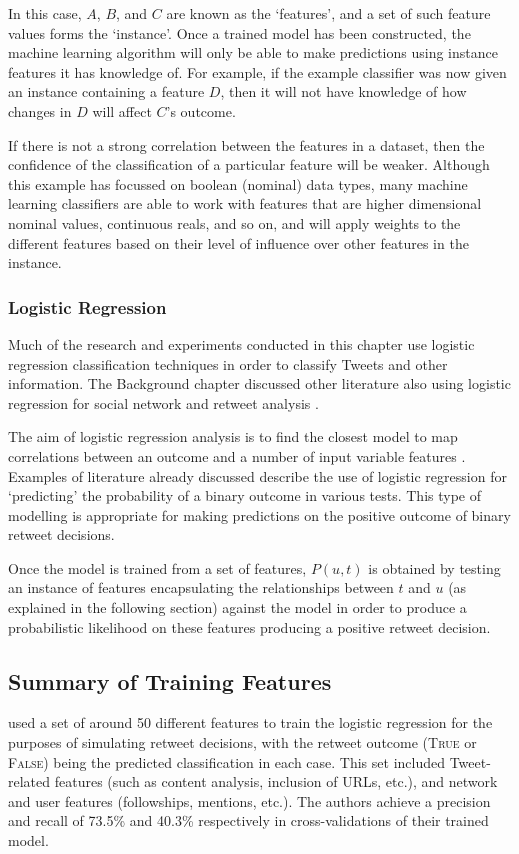 In this case, $A$, $B$, and $C$ are known as the `features', and a set of such feature values forms the `instance'. Once a trained model has been constructed, the machine learning algorithm will only be able to make predictions using instance features it has knowledge of. For example, if the example classifier was now given an instance containing a feature $D$, then it will not have knowledge of how changes in $D$ will affect $C$'s outcome.

If there is not a strong correlation between the features in a dataset, then the confidence of the classification of a particular feature will be weaker. Although this example has focussed on boolean (nominal) data types, many machine learning classifiers are able to work with features that are higher dimensional nominal values, continuous reals, and so on, and will apply weights to the different features based on their level of influence over other features in the instance.


\subsubsection{Logistic Regression}
\label{section:logistic_regression}
Much of the research and experiments conducted in this chapter use logistic regression classification techniques in order to classify Tweets and other information. The Background chapter discussed other literature also using logistic regression for social network and retweet analysis \cite{castillo11, zhu11, peng11, naveed11, hong11}.

The aim of logistic regression analysis is to find the closest model to map correlations between an outcome and a number of input variable features \cite{hosmer13}. Examples of literature already discussed describe the use of logistic regression for `predicting' the probability of a binary outcome in various tests. This type of modelling is appropriate for making predictions on the positive outcome of binary retweet decisions.

Once the model is trained from a set of features, $P(u,t)$ is obtained by testing an instance of features encapsulating the relationships between $t$ and $u$ (as explained in the following section) against the model in order to produce a probabilistic likelihood on these features producing a positive retweet decision. 


\subsection{Summary of Training Features}
\citet{zhu11} used a set of around 50 different features to train the logistic regression for the purposes of simulating retweet decisions, with the retweet outcome (\textsc{True} or \textsc{False}) being the predicted classification in each case. This set included Tweet-related features (such as content analysis, inclusion of URLs, etc.), and network and user features (followships, mentions, etc.). The authors achieve a precision and recall of 73.5\% and 40.3\% respectively in cross-validations of their trained model.

